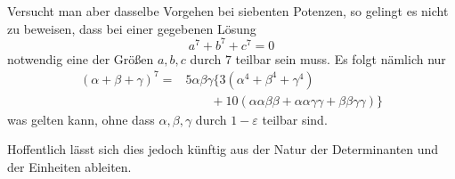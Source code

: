 Versucht man aber dasselbe Vorgehen bei siebenten Potenzen, so gelingt es nicht zu beweisen, dass bei einer gegebenen Lösung
%
\[
a^7+b^7+c^7=0
\]
notwendig eine der Größen $a,b,c$ durch $7$ teilbar sein muss. Es folgt nämlich nur
\[
\begin{aligned}
(\alpha+\beta+\gamma)^7={}&5\alpha\beta\gamma\{3(\alpha^4+\beta^4+\gamma^4)\\
&\qquad+10(\alpha\alpha\beta\beta+\alpha\alpha\gamma\gamma+\beta\beta\gamma\gamma)\}
\end{aligned}
\]
was gelten kann, ohne dass $\alpha,\beta,\gamma$ durch $1-\varepsilon$ teilbar sind.

Hoffentlich lässt sich dies jedoch künftig aus der Natur der Determinanten und der Einheiten ableiten.
